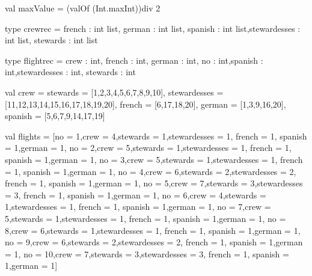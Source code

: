 \documentclass[a4paper]{scrartcl}
\begin{document}
\begin{myverbatim}
val maxValue = (valOf (Int.maxInt))div 2

type crewrec = {french : int list, german : int list,
                spanish : int list,stewardesses : int list, 
                stewards : int list}
                
type flightrec = {crew : int, french : int, german : int,
                  no : int,spanish : int,stewardesses : int,
                  stewards : int}
                  
val crew = {stewards = [1,2,3,4,5,6,7,8,9,10],
            stewardesses = [11,12,13,14,15,16,17,18,19,20],
            french = [6,17,18,20],
            german = [1,3,9,16,20],
            spanish = [5,6,7,9,14,17,19]}
     
val flights = [{no = 1,crew = 4,stewards = 1,stewardesses = 1,
                french = 1, spanish = 1,german = 1},
               {no = 2,crew = 5,stewards = 1,stewardesses = 1,
               french = 1, spanish = 1,german = 1},
               {no = 3,crew = 5,stewards = 1,stewardesses = 1,
               french = 1, spanish = 1,german = 1},
               {no = 4,crew = 6,stewards = 2,stewardesses = 2,
               french = 1, spanish = 1,german = 1},
               {no = 5,crew = 7,stewards = 3,stewardesses = 3,
               french = 1, spanish = 1,german = 1},
               {no = 6,crew = 4,stewards = 1,stewardesses = 1,
               french = 1, spanish = 1,german = 1},
               {no = 7,crew = 5,stewards = 1,stewardesses = 1,
               french = 1, spanish = 1,german = 1},
               {no = 8,crew = 6,stewards = 1,stewardesses = 1,
               french = 1, spanish = 1,german = 1},
               {no = 9,crew = 6,stewards = 2,stewardesses = 2,
               french = 1, spanish = 1,german = 1},
               {no = 10,crew = 7,stewards = 3,stewardesses = 3,
               french = 1, spanish = 1,german = 1}]


\end{myverbatim}
\end{document}
